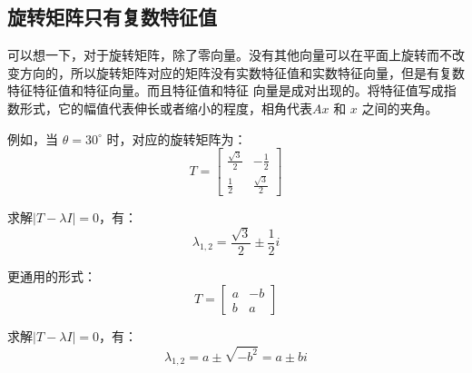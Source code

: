 \documentclass[12pt]{article}
\begin{document}
\subsection{旋转矩阵只有复数特征值}
可以想一下，对于旋转矩阵，除了零向量。没有其他向量可以在平面上旋转而不改变方向的，所以旋转矩阵对应的矩阵没有实数特征值和实数特征向量，但是有复数特征特征值和特征向量。而且特征值和特征 向量是成对出现的。将特征值写成指数形式，它的幅值代表伸长或者缩小的程度，相角代表$Ax$ 和 $x$ 之间的夹角。

例如，当 $\theta = 30^\circ$ 时，对应的旋转矩阵为：
$$
T = \begin{bmatrix}
\frac{\sqrt{3}}{2} & -\frac{1}{2} \\
\frac{1}{2} & \frac{\sqrt{3}}{2}
\end{bmatrix}
$$

求解$|T-\lambda I| = 0$，有：
$$
\lambda_{1,2} = \frac{\sqrt{3}}{2} \pm \frac{1}{2}i
$$

更通用的形式：
$$
T =  \begin{bmatrix}
a & -b \\ b & a
\end{bmatrix}
$$

求解$|T-\lambda I| = 0$，有：
$$
\lambda_{1,2} = a \pm \sqrt{-b^2} = a \pm bi
$$
\end{document}
